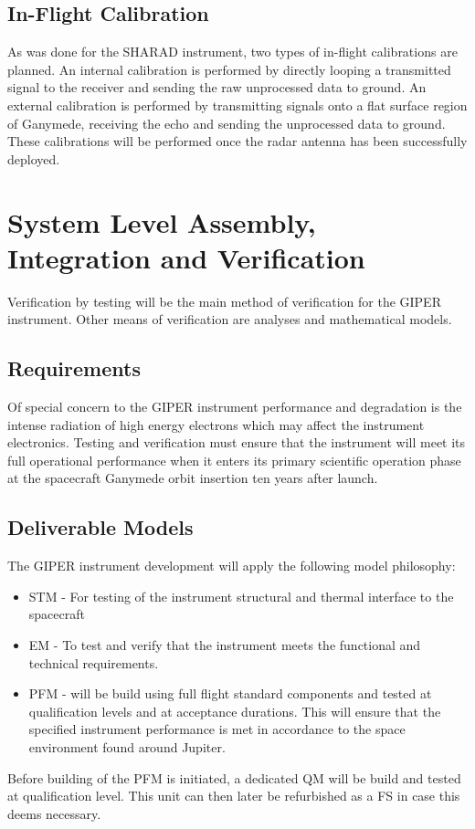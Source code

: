 \subsection{In-Flight Calibration}
As was done for the SHARAD instrument\cite{SHARAD_ppt}, two types of in-flight calibrations are planned. An internal calibration is performed by directly looping a transmitted signal to the receiver and sending the raw unprocessed data to ground. An external calibration is performed by transmitting signals onto a flat surface region of Ganymede, receiving the echo and sending the unprocessed data to ground. These calibrations will be performed once the radar antenna has been successfully deployed.
%
%
\section{System Level Assembly, Integration and Verification}
%
Verification by testing will be the main method of verification for the \ac{GIPER} instrument. Other means of verification are analyses and mathematical models.  
%
\subsection{Requirements}
Of special concern to the \ac{GIPER} instrument performance and degradation is the intense radiation of high energy electrons which may affect the instrument electronics. Testing and verification must ensure that the instrument will meet its full operational performance when it enters its primary scientific operation phase at the spacecraft Ganymede orbit insertion ten years after launch.
%
\subsection{Deliverable Models}
%
The \ac{GIPER} instrument development will apply the following model philosophy:
%
\begin{itemize}
\item \ac{STM} - For testing of the instrument structural and thermal interface to the spacecraft\\
\item \ac{EM} - To test and verify that the instrument meets the functional and technical requirements.\\
\item \ac{PFM} - will be build using full flight standard components and tested at qualification levels and at acceptance durations. This will ensure that the specified instrument performance is met in accordance to the space environment found around Jupiter.
\end{itemize}
%
Before building of the \ac{PFM} is initiated, a dedicated \ac{QM} will be build and tested at qualification level. This unit can then later be refurbished as a \ac{FS} in case this deems necessary.
